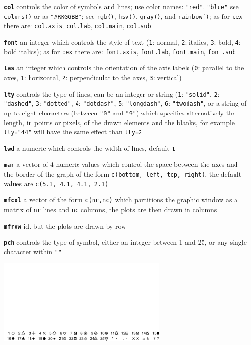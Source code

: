 \documentclass[10pt,landscape]{article}
\newcommand{\code}{\texttt}
\newcommand{\bcode}[1]{\texttt{\textbf{#1}}}
\begin{document}
\begin{multicols*}{3}
\bcode{col}  controls the color of symbols and lines; use color names:
\code{"red"}, \code{"blue"} see \code{colors()} or as \code{"\#RRGGBB"};
see \code{rgb()}, \code{hsv()}, \code{gray()}, and \code{rainbow()}; as for \code{cex} there are: \code{col.axis}, \code{col.lab}, \code{col.main}, \code{col.sub}

\bcode{font}  an integer which controls the style of text (\code{1}: normal, \code{2}: italics, \code{3}: bold, \code{4}: bold italics); as for \code{cex} there are: \code{font.axis}, \code{font.lab}, \code{font.main}, \code{font.sub}

\bcode{las}  an integer which controls the orientation of the axis labels (\code{0}: parallel to the axes, \code{1}: horizontal, \code{2}: perpendicular to the axes, \code{3}: vertical)

\bcode{lty}  controls the type of lines, can be an integer or string (\code{1}: \code{"solid"}, \code{2}: \code{"dashed"}, \code{3}: \code{"dotted"}, \code{4}: \code{"dotdash"}, \code{5}: \code{"longdash"}, \code{6}: \code{"twodash"}, or a string of up to eight characters (between \code{"0"} and \code{"9"}) which specifies alternatively the length, in points or pixels, of the drawn elements and the blanks, for example \code{lty="44"} will have the same effect than \code{lty=2}

\bcode{lwd}  a numeric which controls the width of lines, default \code{1}

\bcode{mar}  a vector of 4 numeric values which control the space between the axes and the border of the graph of the form \code{c(bottom, left, top, right)}, the default values are \code{c(5.1, 4.1, 4.1, 2.1)}

\bcode{mfcol}  a vector of the form \code{c(nr,nc)} which partitions the graphic window as a matrix of \code{nr} lines and \code{nc} columns, the plots are then drawn in columns

\bcode{mfrow}  id. but the plots are drawn by row

\bcode{pch}  controls the type of symbol, either an integer between 1
and 25, or any single character within \code{""}

\samepage\includegraphics[width=8.5cm]{pch_symbol} 


\end{multicols*}
\end{document}
